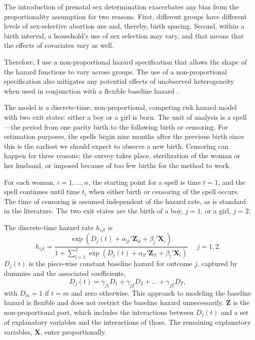 \documentclass[12pt,letterpaper]{article}
\begin{document}
The introduction of prenatal sex determination exacerbates any bias from
the proportionality assumption for two reasons. 
First, different groups have different levels of sex-selective abortion use and, thereby, 
birth spacing. 
Second, within a birth interval, a household's use of sex selection may vary, and that
means that the effects of covariates vary as well.

Therefore, I use a non-proportional hazard specification that allows the shape of the 
hazard functions to vary across groups.
The use of a non-proportional specification also mitigates any potential effects 
of unobserved heterogeneity when used in conjunction with a flexible baseline hazard 
\citep{Dolton1995}.

The model is a discrete-time, non-proportional, competing risk hazard model with two 
exit states: either a boy or a girl is born. 
The unit of analysis is a spell---the period from one parity birth to the following 
birth or censoring. 
For estimation purposes, the spells begin nine months after the previous birth since 
this is the earliest we should expect to observe a new birth. 
Censoring can happen for three reasons: the survey takes place, sterilization of the 
woman or her husband, or imposed because of too few births for the method to work.

For each woman, $i=1,\ldots,n$, the starting point for a spell is time $t=1$, and 
the spell continues until time $t_i$ when either birth or censoring of the spell 
occurs.
The time of censoring is assumed independent of the hazard rate,
as is standard in the literature.
The two exit states are the birth of a boy, $j=1$, or a girl, $j=2$.

The discrete-time hazard rate $h_{ijt}$ is 
\begin{equation}
 h_{ijt} = \frac{\exp(D_j(t) + \alpha_{jt}'\mathbf{Z}_{it} + \beta_j'\mathbf{X}_{i})} 
 {1 + \sum_{l=1}^2 \exp(D_j(t) + \alpha_{lt}'\mathbf{Z}_{it} + \beta_l'\mathbf{X}_{i})} \: \: \; \; \;  j = 1,2.
 \label{eq:hazard}
\end{equation}
$D_{j}(t)$ is the piece-wise constant baseline hazard for outcome $j$, captured
by dummies and the associated coefficients,
\begin{equation}
D_j(t) = \gamma_{j1} D_1 + \gamma_{j2} D_2 + \ldots + \gamma_{jT} D_T,
\end{equation}
with $D_m = 1$ if $t=m$ and zero otherwise.
This approach to modeling the baseline hazard is flexible and does not restrict the 
baseline hazard unnecessarily.
$\mathbf{Z}$ is the non-proportional part, which includes the interactions between 
$D_j(t)$ and a set of explanatory variables and the interactions of those.
The remaining explanatory variables, $\mathbf{X}$, enter proportionally.
\end{document}
